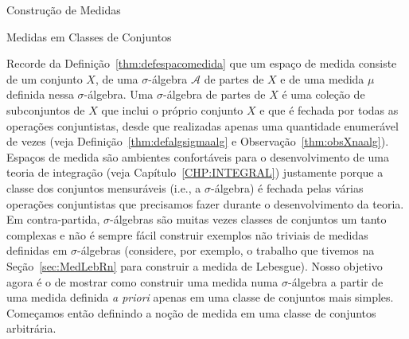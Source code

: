 \documentclass[oneside,final,11pt]{amsbook}
\theoremstyle{remark}\newtheorem{exercise}{Exercício}[chapter]
\theoremstyle{remark}\newtheorem{*exercise}[exercise]{\hbox to 0pt{\hskip 0pt minus 1fil*}Exercício}
\theoremstyle{definition}\newtheorem{exdefin}{Definição}[chapter]
\theoremstyle{plain}\newtheorem{teo}{Teorema}[section]
\theoremstyle{plain}\newtheorem{lem}[teo]{Lema}
\theoremstyle{plain}\newtheorem{prop}[teo]{Proposição}
\theoremstyle{plain}\newtheorem{cor}[teo]{Corolário}
\theoremstyle{definition}\newtheorem{defin}[teo]{Definição}
\theoremstyle{remark}\newtheorem{rem}[teo]{Observação}
\theoremstyle{definition}\newtheorem{notation}[teo]{Notação}
\theoremstyle{definition}\newtheorem{convention}[teo]{Convenção}
\theoremstyle{definition}\newtheorem{example}[teo]{Exemplo}
\numberwithin{section}{chapter}
\numberwithin{equation}{section}
\begin{document}
\begin{chapter}{Construção de Medidas}
\label{CHP:CONSTRUCAO}

\begin{section}{Medidas em Classes de Conjuntos}

Recorde da Definição~\ref{thm:defespacomedida} que um espaço de medida consiste de um conjunto $X$, de
uma $\sigma$-álgebra $\mathcal A$ de partes de $X$ e de uma medida $\mu$ definida nessa $\sigma$-álgebra.
Uma $\sigma$-álgebra de partes de $X$ é uma coleção de subconjuntos de $X$ que inclui o próprio conjunto $X$
e que é fechada por todas as operações conjuntistas, desde que realizadas apenas uma quantidade enumerável de
vezes (veja Definição~\ref{thm:defalgsigmaalg} e Observação~\ref{thm:obsXnaalg}). Espaços de medida são ambientes
confortáveis para o desenvolvimento de uma teoria de integração (veja Capítulo~\ref{CHP:INTEGRAL}) justamente
porque a classe dos conjuntos mensuráveis (i.e., a $\sigma$-álgebra) é fechada pelas várias operações conjuntistas
que precisamos fazer durante o desenvolvimento da teoria. Em contra-partida, $\sigma$-álgebras são muitas vezes
classes de conjuntos um tanto complexas e não é sempre fácil construir exemplos não triviais de medidas definidas
em $\sigma$-álgebras (considere, por exemplo, o trabalho que tivemos na Seção~\ref{sec:MedLebRn} para construir a medida
de Lebesgue). Nosso objetivo agora é o de mostrar como construir uma medida numa $\sigma$-álgebra a partir
de uma medida definida {\it a priori\/} apenas em uma classe de conjuntos mais simples. Começamos então
definindo a noção de medida em uma classe de conjuntos arbitrária.


\end{section}
\end{chapter}
\end{document}
